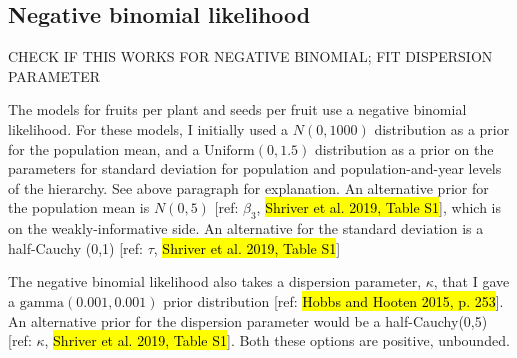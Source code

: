 \documentclass[12pt, oneside, titlepage]{article}   	%
\begin{document}


\iffalse


\subsection*{Negative binomial likelihood}
CHECK IF THIS WORKS FOR NEGATIVE BINOMIAL; FIT DISPERSION PARAMETER

The models for fruits per plant and seeds per fruit use a negative binomial likelihood. For these models, I initially used a $N(0,1000)$ distribution as a prior for the population mean, and a $\mathrm{Uniform}(0,1.5)$ distribution as a prior on the parameters for standard deviation for population and population-and-year levels of the hierarchy. See above paragraph for explanation. An alternative prior for the population mean is $N(0,5)$ [ref: $\beta_3$, \hl{Shriver et al. 2019, Table S1}], which is on the weakly-informative side. An alternative for the standard deviation is a half-Cauchy (0,1) [ref: $\tau$, \hl{Shriver et al. 2019, Table S1}]

 The negative binomial likelihood also takes a dispersion parameter, $\kappa$, that I gave a $\mathrm{gamma}(0.001,0.001)$ prior distribution [ref: \hl{Hobbs and Hooten 2015, p. 253}]. An alternative prior for the dispersion parameter would be a half-Cauchy(0,5) [ref: $\kappa$, \hl{Shriver et al. 2019, Table S1}]. Both these options are positive, unbounded. 
\end{document}
